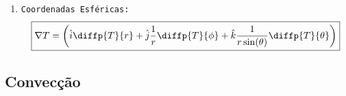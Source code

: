 \documentclass{article}
\begin{document}
\begin{enumerate}[noitemsep, rightmargin = \leftmargin]
                        \begin{enumerate}[noitemsep]
                            \item \texttt{Coordenadas Esféricas:}
                                \begin{equation}
                                    \boxed{
                                        \nabla T = 
                                        \left(
                                            \hat{i}\diffp{T}{r} + 
                                            \hat{j}\frac{1}{r}\diffp{T}{\phi} + 
                                            \hat{k}\frac{1}{r\sin(\theta)}\diffp{T}{\theta}
                                        \right)
                                    }
                                \end{equation}
                        \end{enumerate}
                \end{enumerate}

        \subsection{Convecção}
\end{document}

